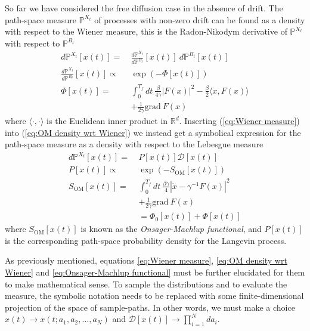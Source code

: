 So far we have considered the free diffusion case in the absence of drift.
The path-space measure $\mathbb{P}^{X_t}$ of processes with non-zero drift can be found as a density with respect to the Wiener measure, this is the Radon-Nikodym derivative of $\mathbb{P}^{X_t}$ with respect to $\mathbb{P}^{B_t}$
\begin{subequations}
\begin{align} \label{eq:OM density wrt Wiener}
d \mathbb{P}^{X_t} [x(t)]  =\  & \frac{d \mathbb{P}^{X_t}}{d \mathbb{P}^{B_t}}[x(t)]\ d \mathbb{P}^{B_t} [x(t)] \\
\frac{d \mathbb{P}^{X_t}}{d \mathbb{P}^{B_t}}[x(t)] \propto\ & \exp \left( - \Phi[x(t)] \right) \\
\Phi[x(t)]  =\ & \label{eq:OM density wrt Wiener action}
\int_0^{T_f} dt\
\frac{\beta}{4 \gamma} |F(x)|^2 
- \frac{\beta}{2} \langle \dot{x}, F(x) \rangle \\
& + \frac{1}{2 \gamma} \text{grad}\ F(x) \nonumber
\end{align}
\end{subequations}
where $\langle \cdot, \cdot\rangle$ is the Euclidean inner product in $\mathbb{R}^d$. Inserting (\ref{eq:Wiener measure}) into (\ref{eq:OM density wrt Wiener}) we instead get a symbolical expression for the path-space measure as a density with respect to the Lebesgue measure
\begin{subequations} 
\begin{align} \label{eq:Onsager-Machlup functional}
d \mathbb{P}^{X_t} [x(t)]  =\ & P[x(t)] \mathcal{D}[x(t)] \\
P[x(t)]  \propto\ & \exp \left( - S_\text{OM}[x(t)] \right) \\
S_\text{OM}[x(t)]  =\  &
\int_0^{T_f} dt\ \frac{\beta \gamma}{4} \left|\dot{x} - \gamma^{-1} F(x) \right|^2  \label{eq:Onsager-Machlup action} \\
& + \frac{1}{2 \gamma} \text{grad}\ F(x) \nonumber \\
& = \Phi_0[x(t)] + \Phi[x(t)] \nonumber
\end{align}
\end{subequations}
where $S_\text{OM}[x(t)]$ is known as the \textit{Onsager-Machlup functional}, and $P[x(t)]$ is the corresponding path-space probability density for the Langevin process.

As previously mentioned, equations \ref{eq:Wiener measure}, \ref{eq:OM density wrt Wiener} and \ref{eq:Onsager-Machlup functional} must be further elucidated for them to make mathematical sense. To sample the distributions and to evaluate the measure, the symbolic notation needs to be replaced with some finite-dimensional projection of the space of sample-paths. In other words, we must make a choice $x(t) \to x(t;a_1, a_2, \dots, a_N)$ and $\mathcal{D}[x(t)] \to \prod_{i=1}^N d a_i$. 

